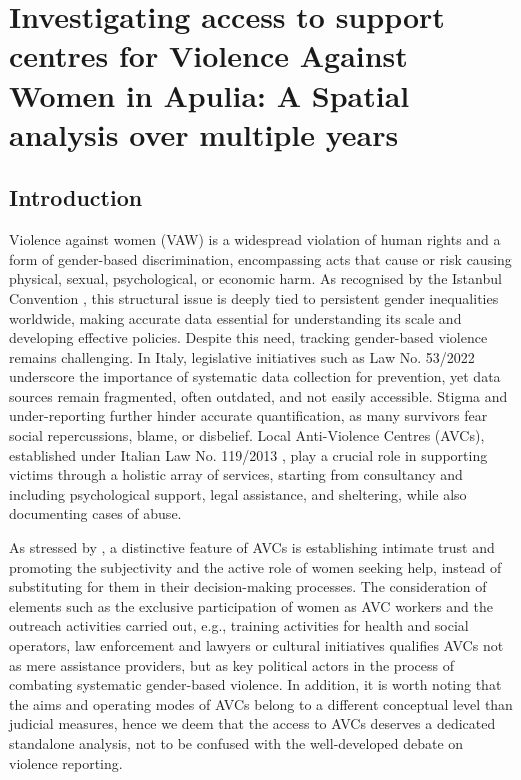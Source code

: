 \documentclass[openany, 11pt, oneside]{book}
\begin{document}
\begin{subappendices}
\end{subappendices}


%
\chapter[Anti-violence Center Accesses in Apulia]{Investigating access to support centres for Violence Against Women in Apulia: A Spatial analysis over multiple years} \label{Chapter:VAW}
\section{Introduction}\label{sec.1}

Violence against women (VAW) is a widespread violation of human rights and a form of gender-based discrimination, encompassing acts that cause or risk causing physical, sexual, psychological, or economic harm. As recognised by the Istanbul Convention \parencite{IstaCon2011}, this structural issue is deeply tied to persistent gender inequalities worldwide, making accurate data essential for understanding its scale and developing effective policies. Despite this need, tracking gender-based violence remains challenging. In Italy, legislative initiatives such as Law No. 53/2022 \parencite{GU2022} underscore the importance of systematic data collection for prevention, yet data sources remain fragmented, often outdated, and not easily accessible. Stigma and under-reporting further hinder accurate quantification, as many survivors fear social repercussions, blame, or disbelief. Local Anti-Violence Centres (AVCs), established under Italian Law No. 119/2013 \parencite{GU2013}, play a crucial role in supporting victims through a holistic array of services, starting from consultancy and including psychological support, legal assistance, and sheltering, while also documenting cases of abuse. 

As stressed by \cite{Toffanin2020}, a distinctive feature of AVCs is establishing intimate trust and promoting the subjectivity and the active role of women seeking help, instead of substituting for them in their decision-making processes. The consideration of elements such as the exclusive participation of women as AVC workers and the outreach activities carried out, e.g., training activities for health and social operators, law enforcement and lawyers or cultural initiatives \parencite{ISTAT2023} qualifies AVCs not as mere assistance providers, but as key political actors in the process of combating systematic gender-based violence. In addition, it is worth noting that the aims and operating modes of AVCs belong to a different conceptual level than judicial measures, hence we deem that the access to AVCs deserves a dedicated standalone analysis, not to be confused with the well-developed debate on violence reporting. 
\end{document}
